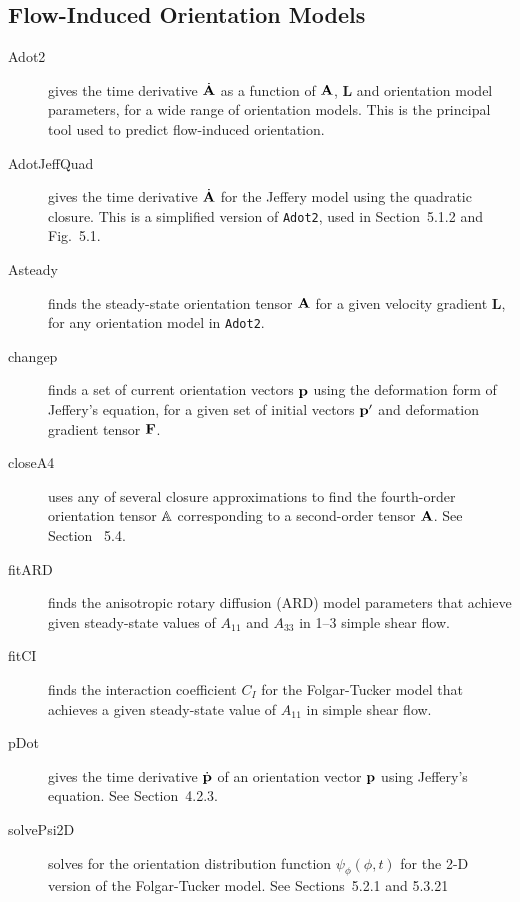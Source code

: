 \documentclass[11pt]{article}
\begin{document}
\subsection{Flow-Induced Orientation Models}

\begin{description}

    \item[Adot2]{gives the time derivative $\dot{\mathbf{A}}$ as a function of $\mathbf{A}$, $\mathbf{L}$ and orientation model parameters, for a wide range of orientation models.  This is the principal tool used to predict flow-induced orientation.}
    
    \item[AdotJeffQuad]{gives the time derivative $\dot{\mathbf{A}}$ for the Jeffery model using the quadratic closure.  This is a simplified version of \texttt{Adot2}, used in Section~5.1.2 and Fig.~5.1.}
    
    \item[Asteady]{finds the steady-state orientation tensor $\mathbf{A}$ for a given velocity gradient $\mathbf{L}$, for any orientation model in \texttt{Adot2}.}
    
    \item[changep]{finds a set of current orientation vectors $\mathbf{p}$ using the deformation form of Jeffery's equation, for a given set of initial vectors $\mathbf{p}'$ and deformation gradient tensor $\mathbf{F}$.}
    
    \item[closeA4]{uses any of several closure approximations to find the fourth-order orientation tensor $\mathbb{A}$ corresponding to a second-order tensor $\mathbf{A}$.  See Section~ 5.4.}  
    
    \item[fitARD]{finds the anisotropic rotary diffusion (ARD) model parameters that achieve given steady-state values of $A_{11}$ and $A_{33}$ in 1--3 simple shear flow.}  
    
    \item[fitCI]{finds the interaction coefficient $C_I$ for the Folgar-Tucker model that achieves a given steady-state value of $A_{11}$ in simple shear flow.}
    
    \item[pDot]{gives the time derivative $\dot{ \mathbf{p}}$ of an orientation vector $\mathbf{p}$ using Jeffery's equation.  See Section~4.2.3.}
    
    \item[solvePsi2D]{solves for the orientation distribution function $\psi_\phi ( \phi, t)$ for the 2-D version of the Folgar-Tucker model.  See Sections~5.2.1 and 5.3.21}
    

\end{description}
\end{document}
